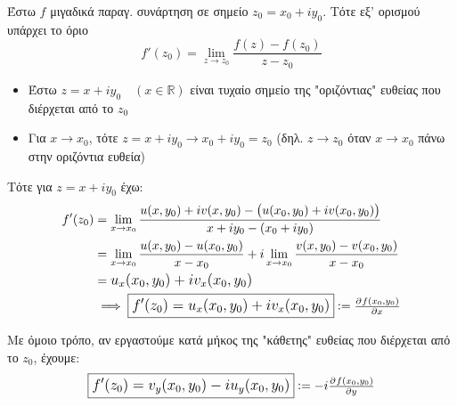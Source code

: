 \documentclass[12pt,a4paper,titlepage,fleqn]{article}
\begin{document}
    \begin{enumgreekparen}
       	\item
       	Έστω \( f \) μιγαδικά παραγ. συνάρτηση σε σημείο \( z_0=x_0+iy_0 \). Τότε
       	εξ' ορισμού υπάρχει το όριο
       	\[
       	f'(z_0)=\lim_{z\to z_0}\frac{f(z)-f(z_0)}{z-z_0}
       	\]
       	
       	\begin{itemize}
       		\item Έστω \( z=x+iy_0\quad (x\in\mathbb R ) \) είναι τυχαίο σημείο της
       		"οριζόντιας" ευθείας που διέρχεται από το \( z_0 \)
       		\item Για \( x\to x_0 \), τότε \( z=x+iy_0 \to x_0+iy_0=z_0 \)
       		(δηλ. \( z\to z_0 \) όταν \( x\to x_0 \) πάνω στην οριζόντια ευθεία)
       	\end{itemize}
       	
       	
       	Τότε για \( z=x+iy_0 \) έχω:
       	\begin{align*}
       	f'(z_0) &= \lim_{x\to x_0}
       	\frac{u(x,y_0)+iv(x,y_0)-\left(
       		u(x_0,y_0)+iv(x_0,y_0)
       		\right)}{x+iy_0-(x_0+iy_0)}
       	\\ &= \lim_{x\to x_0}\frac{
       		u(x,y_0)-u(x_0,y_0)
       	}{x-x_0}+i\lim_{x\to x_0}\frac{v(x,y_0)-v(x_0,y_0)}{x-x_0}
       	\\ &= \mathlarger{u_x(x_0,y_0)+iv_x(x_0,y_0)}
       	\\ &\implies \boxed{
       		\mathlarger{
       			f'(z_0) = u_x(x_0,y_0)+iv_x(x_0,y_0)
       		}
       	} := \pd{f(x_0,y_0)}{x}
       	\end{align*}
       	
       	Με όμοιο τρόπο, αν εργαστούμε κατά μήκος της "κάθετης" ευθείας που διέρχεται
       	από το \( z_0 \), έχουμε:
       	\[
       	\boxed{\mathlarger{
       			f'(z_0) = v_y(x_0,y_0)-iu_y(x_0,y_0)
       		}} := -i\pd{f(x_0,y_0)}{y}
       		\]
       		

\end{enumgreekparen}
\end{document}
